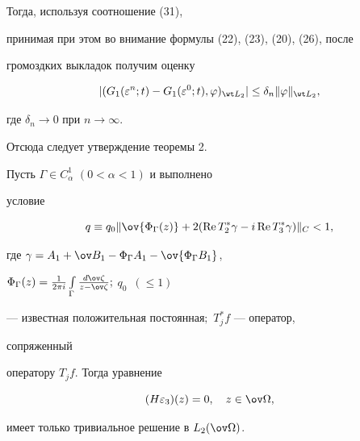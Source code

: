 Тогда, используя соотношение (31), 


принимая при этом во внимание формулы (22), (23), (20), (26), после 


громоздких выкладок получим оценку 


$$ 


|(G_1(\varepsilon^n;t)-G_1(\varepsilon^0;t),\varphi)_{\wt L_2}| 


\le\delta_n\|\varphi\|_{\wt L_2}, 


$$ 


где $\delta_n\to 0$ при $n\to\infty$. 


Отсюда следует утверждение теоремы 2. 


 


\begin{lem} Пусть $\Gamma\in C^1_\alpha$ $(0<\alpha<1)$ и выполнено 


условие 


\begin{equation} 


q\equiv q_0\|\ov{\Phi_\Gamma(z)}+2(\re T^*_2\gamma- 


i\re T^*_3\gamma)\|_C<1, 


\end{equation} 


где $\gamma=A_1+\ov B_1-\Phi_\Gamma A_1-\ov{\Phi_\Gamma B_1}$, 


$\Phi_\Gamma(z)=\frac{1}{2\pi i} 


\int\limits_\Gamma\frac{d\ov\zeta}{z-\ov\zeta};$ $q_0$~$(\le 1)$ 


--- известная положительная постоянная$;$ $T^*_j f$ --- оператор, 


сопряженный 


оператору $T_j f$. Тогда уравнение 


\begin{equation} 


(H\varepsilon_3)(z)=0,\quad z\in\ov\Omega,


\end{equation} 


имеет только тривиальное решение в $L_2(\ov\Omega)$. 


\end{lem} 


 


